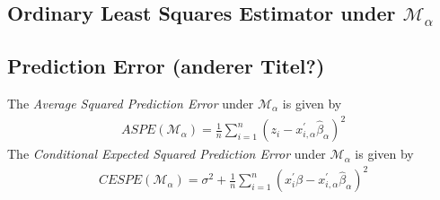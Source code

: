 \documentclass[Research_Module_ES.tex]{subfiles}
\begin{document}
\subsection{Ordinary Least Squares Estimator under $\mathcal{M}_\alpha$}


\subsection{Prediction Error (anderer Titel?)}
The \textit{Average Squared Prediction Error} under $\mathcal{M}_\alpha$ is given by
\begin{align*}
ASPE(\mathcal{M}_\alpha)=\frac{1}{n}\sum_{i=1}^{n}(z_i-x_{i,\alpha}^\prime\hat{\beta}_\alpha)^2
\end{align*}
The \textit{Conditional Expected Squared Prediction Error} under $\mathcal{M}_\alpha$ is given by
\begin{align*}
CESPE(\mathcal{M}_\alpha)=\sigma^2+\frac{1}{n}\sum_{i=1}^{n}(x_i^\prime\beta-x_{i,\alpha}^\prime\hat{\beta}_\alpha)^2
\end{align*}
\end{document}
